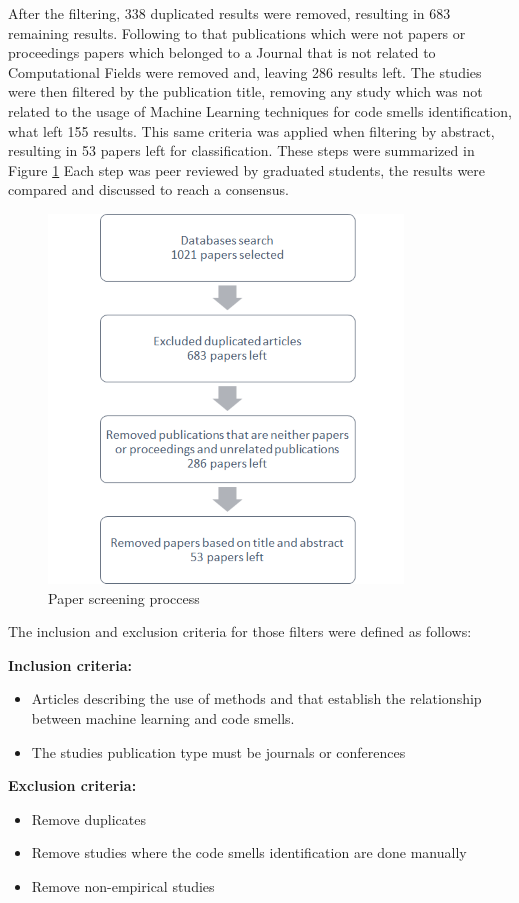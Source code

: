After the filtering, 338 duplicated results were removed, resulting in 683 remaining results. Following to that publications which were not papers or proceedings papers which belonged to a Journal that is not related to Computational Fields were removed and, leaving 286 results left. The studies were then filtered by the publication title, removing any study which was not related to the usage of Machine Learning techniques for code smells identification, what left 155 results. This same criteria was applied when filtering by abstract, resulting in 53 papers left for classification. These steps were summarized in Figure \ref{fig:paperScreening}  Each step was peer reviewed by graduated students, the  results were compared and discussed to reach a consensus.

\begin{figure}[hbt] 
    \centering
    \caption{Paper screening proccess}
	\label{fig:paperScreening}
	\includegraphics[]{imagens/paperScreening.png}
\end{figure}

The inclusion and exclusion criteria for those filters were defined as follows:

\noindent \textbf{Inclusion criteria:}
\begin{itemize}
    \item Articles describing the use of methods and that establish the relationship between machine learning and code smells.
    \item The studies publication type must be journals or conferences
\end{itemize}

\noindent \textbf{Exclusion criteria:}
\begin{itemize}
    \item Remove duplicates
    \item Remove studies where the code smells identification are done manually
    \item Remove non-empirical studies
\end{itemize}

